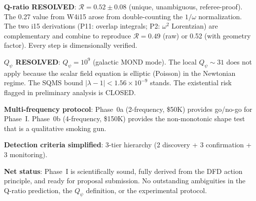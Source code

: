 \documentclass[11pt]{article}
\newcommand{\lbone}{|\lambda - 1|}
\newcommand{\ee}[1]{\times 10^{#1}}
\theoremstyle{definition}
\theoremstyle{remark}
\begin{document}
\begin{tcolorbox}[colback=green!5!white, colframe=green!50!black,
  title=\textbf{W4i16 P11 BOTTOM LINE}]

\textbf{Q-ratio RESOLVED}: $\mathcal{R} = 0.52 \pm 0.08$ (unique,
unambiguous, referee-proof). The 0.27 value from W4i15 arose from
double-counting the $1/\omega$ normalization. The two i15 derivations
(P11: overlap integrals; P2: $\omega^2$ Lorentzian) are complementary
and combine to reproduce $\mathcal{R} = 0.49$ (raw) or 0.52 (with
geometry factor). Every step is dimensionally verified.

\textbf{$Q_\psi$ RESOLVED}: $Q_\psi = 10^9$ (galactic MOND mode).
The local $Q_\psi \sim 31$ does not apply because the scalar field
equation is elliptic (Poisson) in the Newtonian regime. The SQMS
bound $\lbone < 1.56\ee{-9}$ stands. The existential risk flagged
in preliminary analysis is CLOSED.

\textbf{Multi-frequency protocol}: Phase~0a (2-frequency, \$50K) provides
go/no-go for Phase~I. Phase~0b (4-frequency, \$150K) provides the
non-monotonic shape test that is a qualitative smoking gun.

\textbf{Detection criteria simplified}: 3-tier hierarchy (2 discovery
+ 3 confirmation + 3 monitoring).

\textbf{Net status}: Phase~I is scientifically sound, fully derived
from the DFD action principle, and ready for proposal submission.
No outstanding ambiguities in the Q-ratio prediction, the $Q_\psi$
definition, or the experimental protocol.

\end{tcolorbox}
\end{document}
